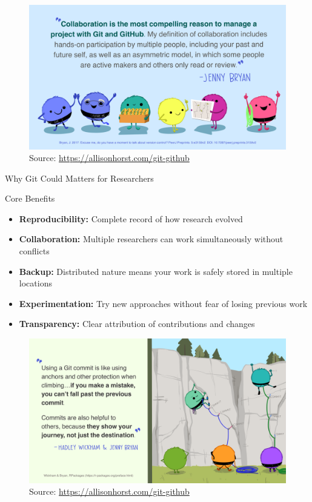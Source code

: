 \documentclass[aspectratio=1609]{beamer}
\begin{document}
\begin{frame}
    \begin{figure}
        \includegraphics[width=\textwidth]{imgs/collaboration.png}
        \caption{Source: \url{https://allisonhorst.com/git-github}}
    \end{figure}
\end{frame}


\begin{frame}{ Why Git Could Matters for Researchers}
    \begin{tblock}{Core Benefits}
        \begin{itemize}
        \item \textbf{Reproducibility:} Complete record of how research evolved
        \item \textbf{Collaboration:} Multiple researchers can work simultaneously without conflicts
        \item \textbf{Backup:} Distributed nature means your work is safely stored in multiple locations
        \item \textbf{Experimentation:} Try new approaches without fear of losing previous work
        \item \textbf{Transparency:} Clear attribution of contributions and changes
    \end{itemize}
    \end{tblock}
\end{frame}


\begin{frame}
    \begin{figure}
        \includegraphics[width=\textwidth]{imgs/git-purpose.png}
        \caption{Source: \url{https://allisonhorst.com/git-github}}
    \end{figure}
\end{frame}
\end{document}
